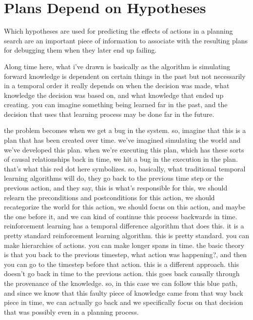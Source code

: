 \section{Plans Depend on Hypotheses}

Which hypotheses are used for predicting the effects of actions in a
planning search are an important piece of information to associate
with the resulting plans for debugging them when they later end up
failing.

Along time here, what i've drawn is basically as the algorithm is simulating forward knowledge is dependent on certain things in the past but not necessarily in a temporal order it really depends on when the decision was made, what knowledge the decision was based on, and what knowledge that ended up creating.
you can imagine something being learned far in the past, and the decision that uses that learning process may be done far in the future.

the problem becomes when we get a bug in the system.
so, imagine that this is a plan that has been created over time.
we've imagined simulating the world and we've developed this plan.
when we're executing this plan, which has these sorts of causal relationships back in time, we hit a bug in the execution in the plan.
that's what this red dot here symbolizes.
so, basically, what traditional temporal learning algorithms will do, they go back to the previous time step or the previous action, and they say, this is what's responsible for this, we should relearn the preconditions and postconditions for this action, we should recategorize the world for this action, we should focus on this action, and maybe the one before it, and we can kind of continue this process backwards in time.
reinforcement learning has a temporal difference algorithm that does this.
it is a pretty standard reinforcement learning algorithm.
this is pretty standard.
you can make hierarchies of actions.
you can make longer spans in time.
the basic theory is that you back to the previous timestep, what action was happening?, and then you can go to the timestep before that action.
this is a different approach.
this doesn't go back in time to the previous action.
this goes back causally through the provenance of the knowledge.
so, in this case we can follow this blue path, and since we know that this faulty piece of knowledge came from that way back piece in time, we can actually go back and we specifically focus on that decision that was possibly even in a planning process.

